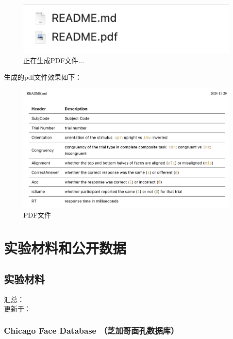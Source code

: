 \documentclass[]{ctexbook}
\theoremstyle{definition}
\theoremstyle{definition}
\theoremstyle{definition}
\theoremstyle{definition}
\theoremstyle{remark}
\begin{document}
\begin{figure}

{\centering \includegraphics[width=0.6\linewidth]{img/vscode/mkreadme_mkpdf} 

}

\caption{正在生成PDF文件...}\label{fig:mkreadme-mkpdf}
\end{figure}

生成的pdf文件效果如下：

\begin{figure}

{\centering \includegraphics[width=1\linewidth]{img/vscode/mkreadme_pdf} 

}

\caption{PDF文件}\label{fig:mkreadme-pdf}
\end{figure}

\part{实验材料和公开数据}\label{part-ux5b9eux9a8cux6750ux6599ux548cux516cux5f00ux6570ux636e}

\chapter{实验材料}\label{materials}

汇总：\\
更新于：

\section{Chicago Face Database （芝加哥面孔数据库）}\label{chicago-face-database-ux829dux52a0ux54e5ux9762ux5b54ux6570ux636eux5e93}
\end{document}
